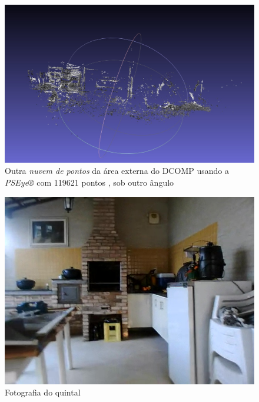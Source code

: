 \begin{figure}[H]
	\centering
		\includegraphics[width= \textwidth]{Imagens/figura4-8.jpg}
	\caption{Outra \textit{nuvem de pontos} da área externa do DCOMP usando a \textit{PSEye®} com 119621 pontos , sob outro ângulo}
	\label{fig4:8}
\end{figure}

\begin{figure}[H]
	\centering
		\includegraphics[width= \textwidth]{Imagens/figura4-12.jpg}
	\caption{Fotografia do quintal}
	\label{fig4:12}
\end{figure}

